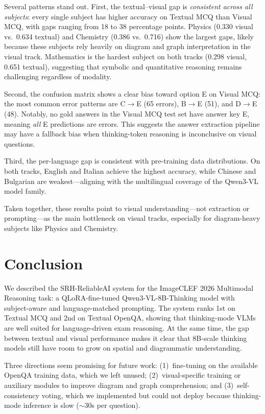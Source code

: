 \documentclass[]{ceurart}
\begin{document}
Several patterns stand out.
First, the textual--visual gap is \textit{consistent across all subjects}: every single subject has higher accuracy on Textual MCQ than Visual MCQ, with gaps ranging from 18 to 38 percentage points.
Physics (0.330 visual vs.\ 0.634 textual) and Chemistry (0.386 vs.\ 0.716) show the largest gaps, likely because these subjects rely heavily on diagram and graph interpretation in the visual track.
Mathematics is the hardest subject on both tracks (0.298 visual, 0.651 textual), suggesting that symbolic and quantitative reasoning remains challenging regardless of modality.

Second, the confusion matrix shows a clear bias toward option E on Visual MCQ: the most common error patterns are C$\rightarrow$E (65 errors), B$\rightarrow$E (51), and D$\rightarrow$E (48).
Notably, no gold answers in the Visual MCQ test set have answer key E, meaning \textit{all} E predictions are errors.
This suggests the answer extraction pipeline may have a fallback bias when thinking-token reasoning is inconclusive on visual questions.

Third, the per-language gap is consistent with pre-training data distributions.
On both tracks, English and Italian achieve the highest accuracy, while Chinese and Bulgarian are weakest---aligning with the multilingual coverage of the Qwen3-VL model family.

Taken together, these results point to visual understanding---not extraction or prompting---as the main bottleneck on visual tracks, especially for diagram-heavy subjects like Physics and Chemistry.


\section{Conclusion}
\label{sec:conclusion}

We described the SRH-ReliableAI system for the ImageCLEF 2026 Multimodal Reasoning task: a QLoRA-fine-tuned Qwen3-VL-8B-Thinking model with subject-aware and language-matched prompting.
The system ranks 1st on Textual MCQ and 2nd on Textual OpenQA, showing that thinking-mode VLMs are well suited for language-driven exam reasoning.
At the same time, the gap between textual and visual performance makes it clear that 8B-scale thinking models still have room to grow on spatial and diagrammatic understanding.

Three directions seem promising for future work:
(1)~fine-tuning on the available OpenQA training data, which we left unused;
(2)~visual-specific training or auxiliary modules to improve diagram and graph comprehension;
and (3)~self-consistency voting, which we implemented but could not deploy because thinking-mode inference is slow ($\sim$30s per question).
\end{document}
